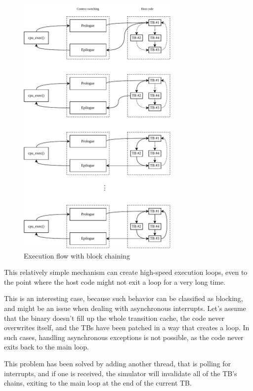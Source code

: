 \begin{figure}[h]
	\centering
    \label{fig:qemu-execution-with-blocks}
	\includegraphics[width=0.7\textwidth]{figures/TbExecution-Chain.pdf}
	\caption{Execution flow with block chaining}
\end{figure}

\noindent
This relatively simple mechanism can create high-speed execution loops, even to the point where the host code
might not exit a loop for a very long time.

This is an interesting case, because such behavior can be classified as
blocking, and might be an issue when dealing with asynchronous interrupts. Let's assume that the binary doesn't fill up
the whole transition cache, the code never overwrites itself, and the TBs have been patched in a way that creates a
loop. In such cases, handling asynchronous exceptions is not possible, as the code never exits back to the main loop.

This problem has been solved by adding another thread, that is polling for interrupts, and if one is received, the
simulator will invalidate all of the TB's chains, exiting to the main loop at the end of the current TB.

